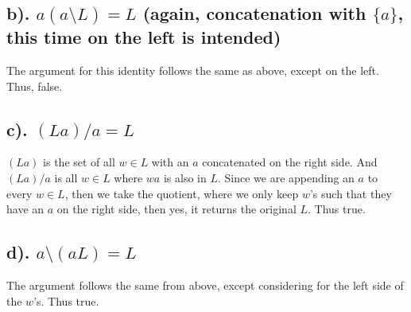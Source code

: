 \documentclass[20pt]{article} %
\begin{document}
\subsection{b). $a(a\setminus L)=L$ (again, concatenation with $\{a\}$, this time on the left is intended)}
The argument for this identity follows the same as above, except on the left.  Thus, false.
\subsection{c). $(La)/a=L$}
$(La)$ is the set of all $w \in L$ with an $a$ concatenated on the right side.  And $(La)/a$ is all $w \in L$ where $wa$ is also in $L$.  Since we are appending an $a$ to every $w \in L$, then we take the quotient, where we only keep $w$'s such that they have an $a$ on the right side, then yes, it returns the original $L$. Thus true.
\subsection{d). $a\setminus (aL)=L$}
The argument follows the same from above, except considering for the left side of the $w$'s. Thus true.

\newpage
\end{document}
